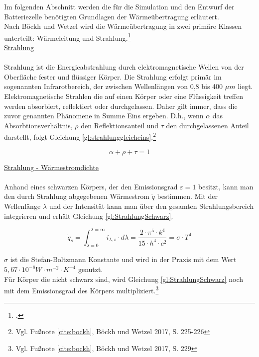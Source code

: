 Im folgenden Abschnitt werden die für die Simulation und den Entwurf der Batteriezelle benötigten Grundlagen der Wärmeübertragung erläutert. \\
Nach Böckh und Wetzel wird die Wärmeübertragung in zwei primäre Klassen unterteilt: Wärmeleitung und Strahlung.\footcite[Vgl.\label{cite:bockh}][S. 4]{Bockh.2017} \\

\underline{Strahlung}\\
\\
Strahlung ist die Energieabstrahlung durch elektromagnetische Wellen von der Oberfläche fester und flüssiger Körper. Die Strahlung erfolgt primär im sogenannten Infrarotbereich, der zwischen Wellenlängen von 0,8 bis 400 $\mu m$ liegt.\\
Elektromagnetische Strahlen die auf einen Körper oder eine Flüssigkeit treffen werden absorbiert, reflektiert oder durchgelassen. Daher gilt immer, dass die zuvor genannten Phänomene in Summe Eins ergeben. D.h., wenn $\alpha$ das Absorbtionsverhältnis, $\rho$ den Reflektionsanteil und $\tau$ den durchgelassenen Anteil darstellt, folgt Gleichung \ref{gl:strahlunggleicheins}.\footnote{Vgl. Fußnote \ref{cite:bockh}, Böckh und Wetzel 2017, S. 225-226}

\begin{equation}
	\alpha + \rho + \tau = 1 \label{gl:strahlunggleicheins}
\end{equation}

\underline{Strahlung - Wärmestromdichte}\\
\\

Anhand eines schwarzen Körpers, der den Emissionsgrad $\varepsilon = 1$ besitzt, kann man den durch Strahlung abgegebenen Wärmestrom $\dot{q}$ bestimmen. Mit der Wellenlänge $\lambda$ und der Intensität kann man über den gesamten Strahlungsbereich integrieren und erhält Gleichung \ref{gl:StrahlungSchwarz}.

\begin{equation}
	\dot{q}_{s} = \int_{\lambda = 0}^{\lambda = \infty} i_{\lambda,s} \cdot d\lambda = \frac{2 \cdot \pi^{5} \cdot k^{4}}{15 \cdot h^{4} \cdot c^{2}} = \sigma \cdot T^{4} \label{gl:StrahlungSchwarz}
\end{equation}

$\sigma$ ist die Stefan-Boltzmann Konstante und wird in der Praxis mit dem Wert\newline $5,67 \cdot 10^{-8} W \cdot m^{-2} \cdot K^{-4}$ genutzt.\\
Für Körper die nicht schwarz sind, wird Gleichung \ref{gl:StrahlungSchwarz} noch mit dem Emissionsgrad des Körpers multipliziert.\footnote{Vgl. Fußnote \ref{cite:bockh}, Böckh und Wetzel 2017, S. 229}\\

